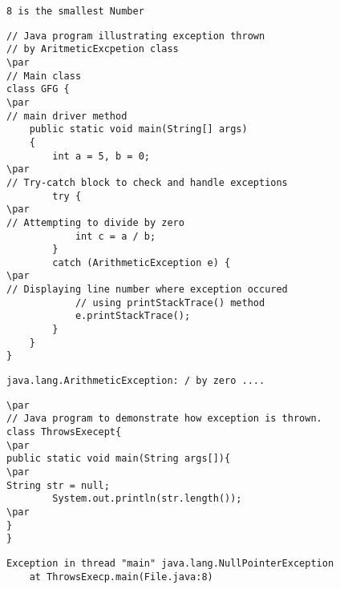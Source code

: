 \documentclass{book}
\def\lthtmlcheckvsize{\ifdim\ht\sizebox<\vsize 
  \ifdim\wd\sizebox<\hsize\expandafter\hfill\fi \expandafter\vfill
  \else\expandafter\vss\fi}%
\begin{document}
{\newpage\clearpage
{}%
\begin{lstlisting}
8 is the smallest Number
\end{lstlisting}%
\lthtmlfigureZ
\lthtmlcheckvsize\clearpage}

{\newpage\clearpage
{}%
\begin{lstlisting}
// Java program illustrating exception thrown
// by AritmeticExcpetion class
\par
// Main class
class GFG {
\par
// main driver method
    public static void main(String[] args)
    {
        int a = 5, b = 0;
\par
// Try-catch block to check and handle exceptions
        try {
\par
// Attempting to divide by zero
            int c = a / b;
        }
        catch (ArithmeticException e) {
\par
// Displaying line number where exception occured
            // using printStackTrace() method
            e.printStackTrace();
        }
    }
}
\end{lstlisting}%
\lthtmlfigureZ
\lthtmlcheckvsize\clearpage}

{\newpage\clearpage
{}%
\begin{lstlisting}
java.lang.ArithmeticException: / by zero ....
\end{lstlisting}%
\lthtmlfigureZ
\lthtmlcheckvsize\clearpage}

{\newpage\clearpage
{}%
\begin{lstlisting}
\par
// Java program to demonstrate how exception is thrown. 
class ThrowsExecept{ 
\par
public static void main(String args[]){ 
\par
String str = null; 
        System.out.println(str.length()); 
\par
} 
} 
\end{lstlisting}%
\lthtmlfigureZ
\lthtmlcheckvsize\clearpage}

{\newpage\clearpage
{}%
\begin{lstlisting}
Exception in thread "main" java.lang.NullPointerException
    at ThrowsExecp.main(File.java:8)
\end{lstlisting}%
\lthtmlfigureZ
\lthtmlcheckvsize\clearpage}
\end{document}
